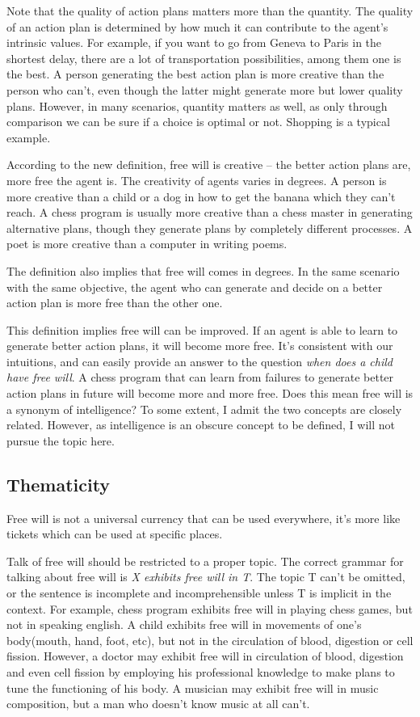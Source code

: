 Note that the quality of action plans matters more than the quantity. The quality of an action plan is determined by how much it can contribute to the agent's intrinsic values. For example, if you want to go from Geneva to Paris in the shortest delay, there are a lot of transportation possibilities, among them one is the best. A person generating the best action plan is more creative than the person who can’t, even though the latter might generate more but lower quality plans. However, in many scenarios, quantity matters as well, as only through comparison we can be sure if a choice is optimal or not. Shopping is a typical example.

According to the new definition, free will is creative -- the better action plans are, more free the agent is. The creativity of agents varies in degrees. A person is more creative than a child or a dog in how to get the banana which they can’t reach. A chess program is usually more creative than a chess master in generating alternative plans, though they generate plans by completely different processes. A poet is more creative than a computer in writing poems.

The definition also implies that free will comes in degrees. In the same scenario with the same objective, the agent who can generate and decide on a better action plan is more free than the other one.

This definition implies free will can be improved. If an agent is able to learn to generate better action plans, it will become more free. It’s consistent with our intuitions, and can easily provide an answer to the question \emph{when does a child have free will}. A chess program that can learn from failures to generate better action plans in future will become more and more free. Does this mean free will is a synonym of intelligence? To some extent, I admit the two concepts are closely related. However, as intelligence is an obscure concept to be defined, I will not pursue the topic here.

\subsection{Thematicity}

Free will is not a universal currency that can be used everywhere, it's more like tickets which can be used at specific places.

Talk of free will should be restricted to a proper topic. The correct grammar for talking about free will is \emph{X exhibits free will in T}. The topic T can’t be omitted, or the sentence is incomplete and incomprehensible unless T is implicit in the context. For example, chess program exhibits free will in playing chess games, but not in speaking english. A child exhibits free will in movements of one’s body(mouth, hand, foot, etc), but not in the circulation of blood, digestion or cell fission. However, a doctor may exhibit free will in circulation of blood, digestion and even cell fission by employing his professional knowledge to make plans to tune the functioning of his body. A musician may  exhibit free will in music composition, but a man who doesn’t know music at all can’t.

